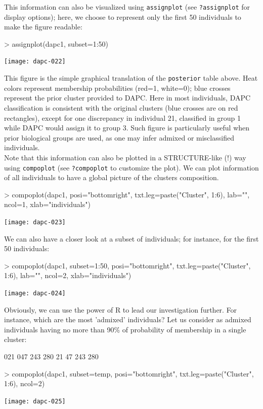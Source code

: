 \documentclass{article}
\newcommand{\code}[1]{{{\tt #1}}}
\begin{document}
This information can also be visualized using \texttt{assignplot} (see \texttt{?assignplot} for display
options); here, we choose to represent only the first 50 individuals to make the figure readable:
\begin{Schunk}
\begin{Sinput}
> assignplot(dapc1, subset=1:50)
\end{Sinput}
\end{Schunk}
\texttt{[image: dapc-022]}

\noindent
This figure is the simple graphical translation of the \texttt{posterior} table above. Heat colors
represent membership probabilities
(red=1, white=0); blue crosses represent the prior cluster provided to DAPC.
Here in most individuals, DAPC classification is consistent with the original
clusters (blue crosses are on red rectangles), except for one discrepancy in individual 21, classified
in group 1 while DAPC would assign it to group 3.
Such figure is particularly useful when prior biological groups are used, as one may infer admixed
or misclassified individuals.
\\

Note that this information can also be plotted in a STRUCTURE-like (!) way using \texttt{compoplot}
(see \code{?compoplot} to customize the plot).
We can plot information of all individuals to have a global picture of the clusters composition.
\begin{Schunk}
\begin{Sinput}
> compoplot(dapc1, posi="bottomright", txt.leg=paste("Cluster", 1:6), lab="", ncol=1, xlab="individuals")
\end{Sinput}
\end{Schunk}
\texttt{[image: dapc-023]}

\noindent We can also have a closer look at a subset of individuals; for instance, for the first 50 individuals:
\begin{Schunk}
\begin{Sinput}
> compoplot(dapc1, subset=1:50, posi="bottomright", txt.leg=paste("Cluster", 1:6), lab="", ncol=2, xlab="individuals")
\end{Sinput}
\end{Schunk}
\texttt{[image: dapc-024]}

Obviously, we can use the power of R to lead our investigation further. For instance, which are the
most 'admixed' individuals?
Let us consider as admixed individuals having no more than 90\% of probability of membership in a single cluster:
\begin{Schunk}
\begin{Soutput}
021 047 243 280 
 21  47 243 280 
\end{Soutput}
\begin{Sinput}
> compoplot(dapc1, subset=temp, posi="bottomright", txt.leg=paste("Cluster", 1:6),  ncol=2)
\end{Sinput}
\end{Schunk}
\texttt{[image: dapc-025]}
\end{document}
